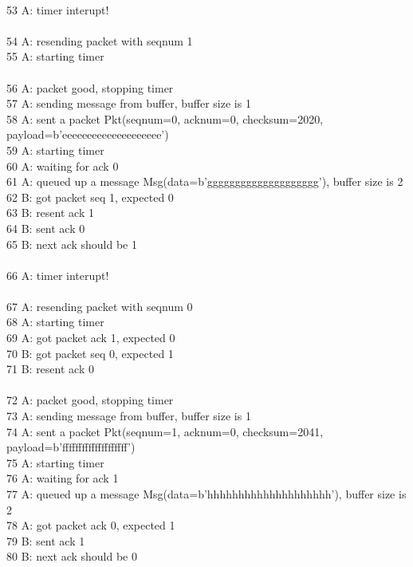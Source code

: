 \documentclass{article}
\begin{document}
{\\
53 A: timer interupt!\\
\\
54 A: resending packet with seqnum 1\\
55 A: starting timer\\
\\
56 A: packet good, stopping timer\\
57 A: sending message from buffer, buffer size is 1\\
58 A: sent a packet Pkt(seqnum=0, acknum=0, checksum=2020, payload=b'eeeeeeeeeeeeeeeeeeee')\\
59 A: starting timer\\
60 A: waiting for ack 0\\
61 A: queued up a message Msg(data=b'gggggggggggggggggggg'), buffer size is 2\\
62 B: got packet seq 1, expected 0\\
63 B: resent  ack 1\\
64 B: sent ack 0\\
65 B: next ack should be 1\\
\\
66 A: timer interupt!\\
\\
67 A: resending packet with seqnum 0\\
68 A: starting timer\\
69 A: got packet ack 1, expected 0\\
70 B: got packet seq 0, expected 1\\
71 B: resent  ack 0\\
\\
72 A: packet good, stopping timer\\
73 A: sending message from buffer, buffer size is 1\\
74 A: sent a packet Pkt(seqnum=1, acknum=0, checksum=2041, payload=b'ffffffffffffffffffff')\\
75 A: starting timer\\
76 A: waiting for ack 1\\
77 A: queued up a message Msg(data=b'hhhhhhhhhhhhhhhhhhhh'), buffer size is 2\\
78 A: got packet ack 0, expected 1\\
79 B: sent ack 1\\
80 B: next ack should be 0\\
}
\end{document}
